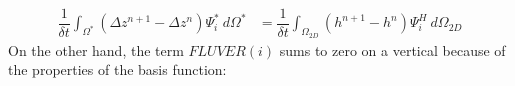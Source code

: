 \begin{equation}
\begin{array}{ll}
\dfrac{1}{\delta t}\displaystyle{\int_{\Omega^{\ast}}}\left(\Delta z^{n+1}-\Delta z^{n}\right)\Psi_{i}^{\ast}~d\Omega^{\ast} &=
\dfrac{1}{\delta t}\displaystyle{\int_{\Omega_{2D}}}(h^{n+1}-h^n)\Psi_i^H~d\Omega_{2D}
\end{array}
\end{equation}
On the other hand, the term $FLUVER(i)$ sums to zero on a
vertical because of the properties of the basis function:

